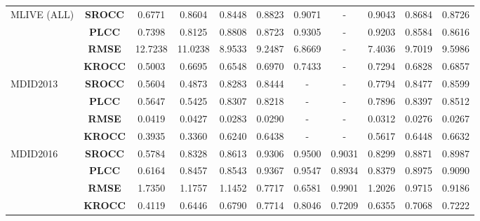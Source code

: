\begin{sidewaystable}[htb]
\begin{tabular}{m{2cm}|c||c|c|c|c||c|c|c|m{1.2cm}|m{1cm}}
             \hline\hline
             \multirow{4}{4em}{MLIVE (ALL)}&\textbf{SROCC}&0.6771&0.8604&0.8448&0.8823&0.9071&-&0.9043&0.8684&0.8726\\[1ex]
             &\textbf{PLCC}&0.7398&0.8125&0.8808&0.8723&0.9305&-&0.9203&0.8584&0.8616\\[1ex]
             &\textbf{RMSE}&12.7238&11.0238&8.9533&9.2487&6.8669&-&7.4036&9.7019&9.5986\\[1ex]
             &\textbf{KROCC}&0.5003&0.6695&0.6548&0.6970&0.7433&-&0.7294&0.6828&0.6857\\[1ex]
             \hline\hline
             \multirow{4}{4em}{MDID2013}&\textbf{SROCC}&0.5604&0.4873&0.8283&0.8444&-&-&0.7794&0.8477&0.8599\\[1ex]
             &\textbf{PLCC}&0.5647&0.5425&0.8307&0.8218&-&-&0.7896&0.8397&0.8512\\[1ex]
             &\textbf{RMSE}&0.0419&0.0427&0.0283&0.0290&-&-&0.0312&0.0276&0.0267\\[1ex]
             &\textbf{KROCC}&0.3935&0.3360&0.6240&0.6438&-&-&0.5617&0.6448&0.6632\\[1ex]
             \hline\hline
             \multirow{4}{4em}{MDID2016}&\textbf{SROCC}&0.5784&0.8328&0.8613&0.9306&0.9500&0.9031&0.8299&0.8871&0.8987\\[1ex]
             &\textbf{PLCC}&0.6164&0.8457&0.8543&0.9367&0.9547&0.8934&0.8379&0.8975&0.9090\\[1ex]
             &\textbf{RMSE}&1.7350&1.1757&1.1452&0.7717&0.6581&0.9901&1.2026&0.9715&0.9186\\[1ex]
             &\textbf{KROCC}&0.4119&0.6446&0.6790&0.7714&0.8046&0.7209&0.6355&0.7068&0.7222\\[1ex]
             \hline\hline
             
        \end{tabular}\hspace*{-1cm}
\end{sidewaystable}
